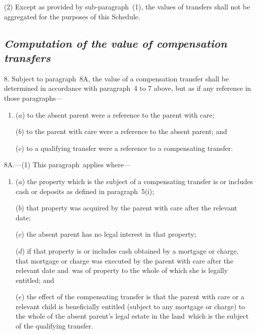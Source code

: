 \documentclass[12pt,a4paper]{article}
\begin{document}
(2) Except as provided by sub-paragraph~(1), the values of transfers shall not be aggregated for the purposes of this Schedule.

\subsection*{\itshape Computation of the value of compensation transfers}

8.  
Subject to paragraph~8A, the value of  %
a compensation transfer shall be determined in accordance with paragraph~4 to 7 above, but as if any reference in those paragraphs—
\begin{enumerate}\item[]
($a$) to the absent parent were a reference to the parent with care;

($b$) to the parent with care were a reference to the absent parent; and

($c$) to a qualifying transfer were a reference to a compensating transfer.
\end{enumerate}


\medskip

8A.—(1) This paragraph~applies where—
\begin{enumerate}\item[]
($a$) the property which is the subject of a compensating transfer is or includes cash or deposits as defined in paragraph~5(i);

($b$) that property was acquired by the parent with care after the relevant date;

($c$) the absent parent has no legal interest in that property;

($d$) if that property is or includes cash obtained by a mortgage or charge, that mortgage or charge was executed by the parent with care after the relevant date and~was of property to the whole of which she is legally entitled; and

($e$) the effect of the compensating transfer is that the parent with care or a relevant child is beneficially entitled (subject to any mortgage or charge) to the whole of the absent parent’s legal estate in the land~which is the subject of the qualifying transfer.
\end{enumerate}
\end{document}
